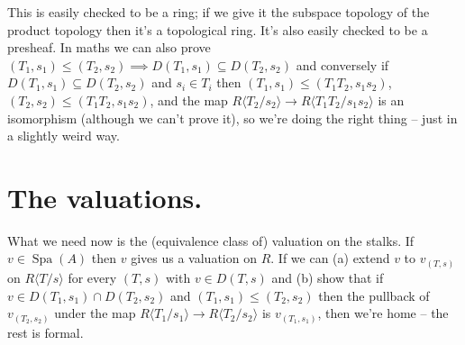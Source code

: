 \documentclass{amsart}
\DeclareMathOperator{\Spa}{Spa}
\theoremstyle{plain}
\theoremstyle{remark}
\begin{document}
This is easily checked to be a ring; if we give it the subspace topology of the product topology then it's a topological ring. It's also easily checked to be a presheaf. In maths we can also prove $(T_1,s_1)\leq(T_2,s_2)\implies D(T_1,s_1)\subseteq D(T_2,s_2)$ and conversely if $D(T_1,s_1)\subseteq D(T_2,s_2)$ and $s_i\in T_i$ then $(T_1,s_1)\leq (T_1T_2,s_1s_2)$, $(T_2,s_2)\leq (T_1T_2,s_1s_2)$, and the map $R\langle T_2/s_2\rangle \to R\langle T_1T_2/s_1s_2\rangle$ is an isomorphism (although we can't prove it), so we're doing the right thing -- just in a slightly weird way.

\section{The valuations.}

What we need now is the (equivalence class of) valuation on the stalks. If $v\in\Spa(A)$ then $v$ gives us a valuation on $R$. If we can (a) extend $v$ to $v_{(T,s)}$ on $R\langle T/s\rangle$ for every $(T,s)$ with $v\in D(T,s)$ and (b) show that if $v\in D(T_1,s_1)\cap D(T_2,s_2)$ and $(T_1,s_1)\leq (T_2,s_2)$ then the pullback of $v_{(T_2,s_2)}$ under the map $R\langle T_1/s_1\rangle\to R\langle T_2/s_2\rangle$ is $v_{(T_1,s_1)}$, then we're home -- the rest is formal. 
\end{document}
